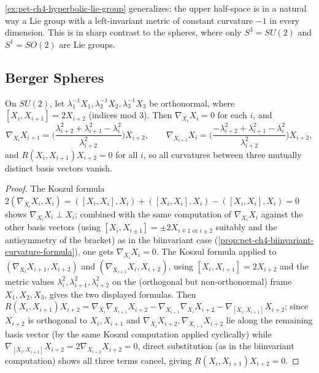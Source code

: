 \begin{remark}
  \label{rem:pet-ch4-lie-group-spheres-contrast}
  \cref{ex:pet-ch4-hyperbolic-lie-group} generalizes: the upper half-space is
  in a natural way a Lie group with a left-invariant metric of constant
  curvature $-1$ in every dimension. This is in sharp contrast to the spheres,
  where only $S^3=SU(2)$ and $S^1=SO(2)$ are Lie groups.
\end{remark}

\subsection{Berger Spheres}

\begin{example}
  \label{ex:pet-ch4-general-berger-metric}
  On $SU(2)$, let $\lambda_1^{-1}X_1,\lambda_2^{-1}X_2,\lambda_3^{-1}X_3$ be
  orthonormal, where $[X_i,X_{i+1}]=2X_{i+2}$ (indices mod $3$). Then
  $\nabla_{X_i}X_i=0$ for each $i$, and
  \[
    \nabla_{X_i}X_{i+1}=\Big(\frac{\lambda_{i+2}^2+\lambda_{i+1}^2-\lambda_i^2}{\lambda_{i+2}^2}\Big)X_{i+2},
    \qquad
    \nabla_{X_{i+1}}X_i=\Big(\frac{-\lambda_{i+2}^2+\lambda_{i+1}^2-\lambda_i^2}{\lambda_{i+2}^2}\Big)X_{i+2},
  \]
  and $R(X_i,X_{i+1})X_{i+2}=0$ for all $i$, so all curvatures between three
  mutually distinct basis vectors vanish.
\end{example}
\begin{proof}
  The Koszul formula
  $2(\nabla_{X_i}X_i,X_i)=([X_i,X_i],X_i)+([X_i,X_i],X_i)-([X_i,X_i],X_i)=0$
  shows $\nabla_{X_i}X_i\perp X_i$; combined with the same computation of
  $\nabla_{X_i}X_i$ against the other basis vectors (using
  $[X_i,X_{i\pm1}]=\pm2X_{i\mp1\text{ or }i\pm2}$ suitably and the
  antisymmetry of the bracket) as in the biinvariant case
  (\cref{prop:pet-ch4-biinvariant-curvature-formula}), one gets
  $\nabla_{X_i}X_i=0$. The Koszul formula applied to $(\nabla_{X_i}X_{i+1},X_{i+2})$
  and $(\nabla_{X_{i+1}}X_i,X_{i+2})$, using $[X_i,X_{i+1}]=2X_{i+2}$ and the
  metric values $\lambda_i^2,\lambda_{i+1}^2,\lambda_{i+2}^2$ on the
  (orthogonal but non-orthonormal) frame $X_1,X_2,X_3$, gives the two
  displayed formulas. Then
  $R(X_i,X_{i+1})X_{i+2}=\nabla_{X_i}\nabla_{X_{i+1}}X_{i+2}-\nabla_{X_{i+1}}\nabla_{X_i}X_{i+2}-\nabla_{[X_i,X_{i+1}]}X_{i+2}$;
  since $X_{i+2}$ is orthogonal to $X_i,X_{i+1}$ and
  $\nabla_{X_i}X_{i+2},\nabla_{X_{i+1}}X_{i+2}$ lie along the remaining basis
  vector (by the same Koszul computation applied cyclically) while
  $\nabla_{[X_i,X_{i+1}]}X_{i+2}=2\nabla_{X_{i+2}}X_{i+2}=0$, direct
  substitution (as in the biinvariant computation) shows all three terms
  cancel, giving $R(X_i,X_{i+1})X_{i+2}=0$.
\end{proof}

